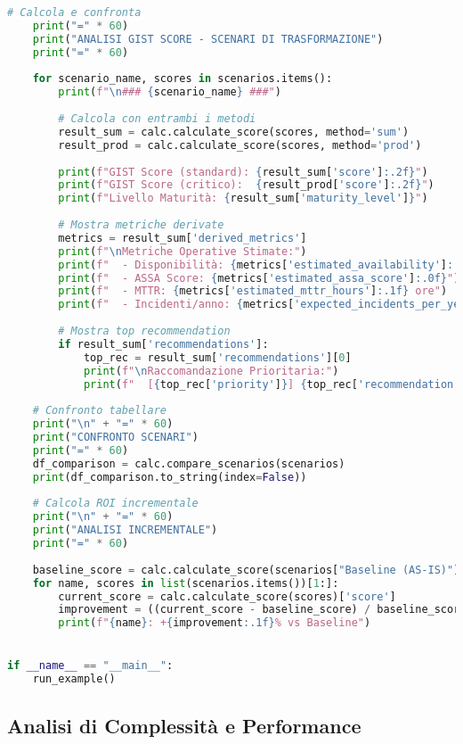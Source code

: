 \begin{lstlisting}[language=Python, caption={Implementazione completa GIST Calculator con validazione e reporting}]
    # Calcola e confronta
    print("=" * 60)
    print("ANALISI GIST SCORE - SCENARI DI TRASFORMAZIONE")
    print("=" * 60)
    
    for scenario_name, scores in scenarios.items():
        print(f"\n### {scenario_name} ###")
        
        # Calcola con entrambi i metodi
        result_sum = calc.calculate_score(scores, method='sum')
        result_prod = calc.calculate_score(scores, method='prod')
        
        print(f"GIST Score (standard): {result_sum['score']:.2f}")
        print(f"GIST Score (critico):  {result_prod['score']:.2f}")
        print(f"Livello Maturità: {result_sum['maturity_level']}")
        
        # Mostra metriche derivate
        metrics = result_sum['derived_metrics']
        print(f"\nMetriche Operative Stimate:")
        print(f"  - Disponibilità: {metrics['estimated_availability']:.3f}%")
        print(f"  - ASSA Score: {metrics['estimated_assa_score']:.0f}")
        print(f"  - MTTR: {metrics['estimated_mttr_hours']:.1f} ore")
        print(f"  - Incidenti/anno: {metrics['expected_incidents_per_year']:.0f}")
        
        # Mostra top recommendation
        if result_sum['recommendations']:
            top_rec = result_sum['recommendations'][0]
            print(f"\nRaccomandazione Prioritaria:")
            print(f"  [{top_rec['priority']}] {top_rec['recommendation']}")
    
    # Confronto tabellare
    print("\n" + "=" * 60)
    print("CONFRONTO SCENARI")
    print("=" * 60)
    df_comparison = calc.compare_scenarios(scenarios)
    print(df_comparison.to_string(index=False))
    
    # Calcola ROI incrementale
    print("\n" + "=" * 60)
    print("ANALISI INCREMENTALE")
    print("=" * 60)
    
    baseline_score = calc.calculate_score(scenarios["Baseline (AS-IS)"])['score']
    for name, scores in list(scenarios.items())[1:]:
        current_score = calc.calculate_score(scores)['score']
        improvement = ((current_score - baseline_score) / baseline_score) * 100
        print(f"{name}: +{improvement:.1f}% vs Baseline")


if __name__ == "__main__":
    run_example()
\end{lstlisting}

\subsection{\texorpdfstring{Analisi di Complessità e Performance}{C.4.3 - Analisi di Complessità e Performance}}

